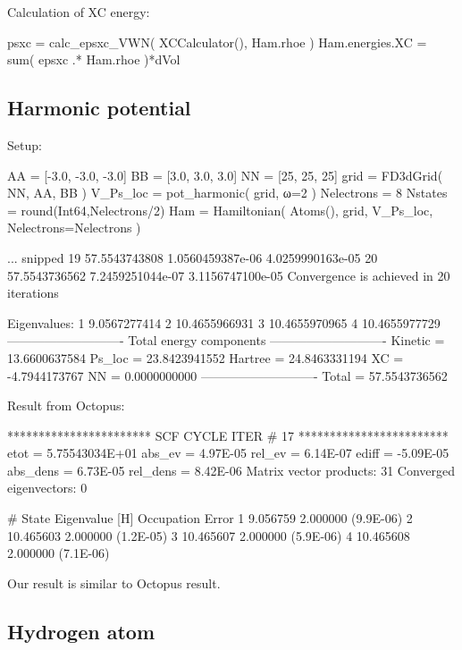 Calculation of XC energy:
\begin{juliacode}
psxc = calc_epsxc_VWN( XCCalculator(), Ham.rhoe )
Ham.energies.XC = sum( epsxc .* Ham.rhoe )*dVol
\end{juliacode}

\subsection{Harmonic potential}

Setup:
\begin{juliacode}
AA = [-3.0, -3.0, -3.0]
BB = [3.0, 3.0, 3.0]
NN = [25, 25, 25]
grid = FD3dGrid( NN, AA, BB )
V_Ps_loc = pot_harmonic( grid, ω=2 )
Nelectrons = 8
Nstates = round(Int64,Nelectrons/2)
Ham = Hamiltonian( Atoms(), grid, V_Ps_loc, Nelectrons=Nelectrons )
\end{juliacode}

\begin{textcode}
... snipped
  19      57.5543743808   1.0560459387e-06   4.0259990163e-05
  20      57.5543736562   7.2459251044e-07   3.1156747100e-05
Convergence is achieved in 20 iterations

Eigenvalues:
 1       9.0567277414
 2      10.4655966931
 3      10.4655970965
 4      10.4655977729
----------------------------
Total energy components
----------------------------
Kinetic =      13.6600637584
Ps_loc  =      23.8423941552
Hartree =      24.8463331194
XC      =      -4.7944173767
NN      =       0.0000000000
----------------------------
Total   =      57.5543736562
\end{textcode}


Result from Octopus:
\begin{textcode}
*********************** SCF CYCLE ITER #   17 ************************
 etot  =  5.75543034E+01 abs_ev   =  4.97E-05 rel_ev   =  6.14E-07
 ediff =       -5.09E-05 abs_dens =  6.73E-05 rel_dens =  8.42E-06
Matrix vector products:     31
Converged eigenvectors:      0

#  State  Eigenvalue [H]  Occupation    Error
      1        9.056759    2.000000   (9.9E-06)
      2       10.465603    2.000000   (1.2E-05)
      3       10.465607    2.000000   (5.9E-06)
      4       10.465608    2.000000   (7.1E-06) 
\end{textcode}

Our result is similar to Octopus result.


\subsection{Hydrogen atom}

